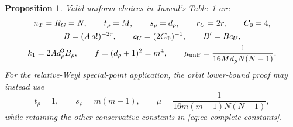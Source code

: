 \documentclass[11pt]{article}
\newtheorem{proposition}[theorem]{Proposition}
\theoremstyle{definition}
\theoremstyle{remark}
\begin{document}
\begin{proposition}\label{prop:ea-explicit-constants}
Valid uniform choices in Jaswal's Table~1 are
\begin{equation}\label{eq:ea-complete-constants}
 \begin{gathered}
 n_T=R_G=N,\qquad t_\rho=M,\qquad s_\rho=d_\rho,
 \qquad r_U=2r,\qquad C_0=4,\\
 B=(A\,a!)^{-2r},\qquad c_U=(2C_\Phi)^{-1},\qquad B'=Bc_U,\\
 k_1=2A d_\rho^3B_\rho,\qquad
 f=(d_\rho+1)^2=m^4,\qquad
 \mu_{\rm unif}=\frac1{16Md_\rho N(N-1)}.
 \end{gathered}
\end{equation}
For the relative-Weyl special-point application, the orbit lower-bound
proof may instead use
\begin{equation}\label{eq:ea-point-mu}
 t_\rho=1,\qquad s_\rho=m(m-1),\qquad
 \mu=\frac1{16m(m-1)N(N-1)},
\end{equation}
while retaining the other conservative constants in
\eqref{eq:ea-complete-constants}.
\end{proposition}
\end{document}
